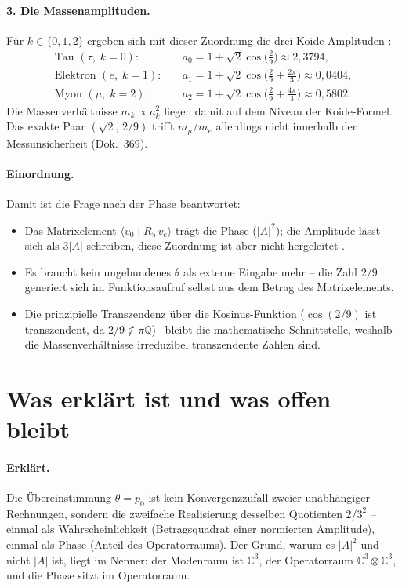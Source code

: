 \paragraph{3. Die Massenamplituden.}
Für $k\in\{0,1,2\}$ ergeben sich mit dieser Zuordnung die drei Koide-Amplituden \KM:
\begin{align*}
  \text{Tau }(\tau,\;k=0): &\quad a_0 = 1+\sqrt2\cos\!\bigl(\tfrac{2}{9}\bigr)
    \approx 2{,}3794, \\
  \text{Elektron }(e,\;k=1): &\quad a_1 = 1+\sqrt2\cos\!\bigl(\tfrac{2}{9}+\tfrac{2\pi}{3}\bigr)
    \approx 0{,}0404, \\
  \text{Myon }(\mu,\;k=2): &\quad a_2 = 1+\sqrt2\cos\!\bigl(\tfrac{2}{9}+\tfrac{4\pi}{3}\bigr)
    \approx 0{,}5802.
\end{align*}
Die Massenverhältnisse $m_k \propto a_k^2$ liegen damit auf dem Niveau der
Koide-Formel. Das exakte Paar $(\sqrt2,\,2/9)$ trifft $m_\mu/m_e$ allerdings nicht
innerhalb der Messunsicherheit (Dok.~369).

\paragraph{Einordnung.}
Damit ist die Frage nach der Phase beantwortet:
\begin{itemize}
  \item Das Matrixelement $\langle v_0 \mid R_5\, v_e\rangle$ trägt die Phase
    ($|A|^2$); die Amplitude lässt sich als $3|A|$ schreiben, diese Zuordnung
    ist aber nicht hergeleitet \SM.
  \item Es braucht kein ungebundenes $\theta$ als externe Eingabe mehr -- die
    Zahl $2/9$ generiert sich im Funktionsaufruf selbst aus dem Betrag des
    Matrixelements.
  \item Die prinzipielle Transzendenz über die Kosinus-Funktion ($\cos(2/9)$
    ist transzendent, da $2/9\notin\pi\mathbb{Q}$) \EM\ bleibt die mathematische
    Schnittstelle, weshalb die Massenverhältnisse irreduzibel transzendente
    Zahlen sind.
\end{itemize}

\section{Was erklärt ist und was offen bleibt}

\paragraph{Erklärt.} Die Übereinstimmung $\theta = p_0$ ist kein Konvergenzzufall zweier
unabhängiger Rechnungen, sondern die zweifache Realisierung desselben Quotienten $2/3^2$ --
einmal als Wahrscheinlichkeit (Betragsquadrat einer normierten Amplitude), einmal als Phase (Anteil
des Operatorraums). Der Grund, warum es $|A|^2$ und nicht $|A|$ ist, liegt im Nenner: der
Modenraum ist $\mathbb{C}^3$, der Operatorraum $\mathbb{C}^3\otimes\mathbb{C}^3$, und die Phase
sitzt im Operatorraum.

